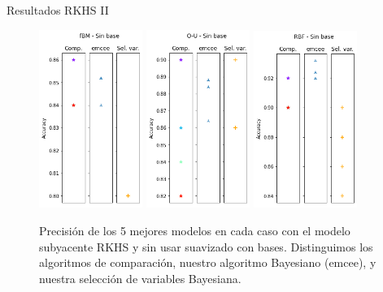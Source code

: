 \documentclass[10pt, spanish, professionalfonts]{beamer}
\begin{document}
\begin{frame}{Resultados RKHS II}
  \begin{figure}
    \includegraphics[width=0.3\textwidth]{img/results/log_rkhs_fbm_nobase}\hfill
    \includegraphics[width=0.3\textwidth]{img/results/log_rkhs_ou_nobase}\hfill
    \includegraphics[width=0.3\textwidth]{img/results/log_rkhs_rbf_nobase}
    \caption{Precisión de los 5 mejores modelos en cada caso con el modelo subyacente RKHS y sin usar suavizado con bases. Distinguimos los algoritmos de comparación, nuestro algoritmo Bayesiano (emcee), y nuestra selección de variables Bayesiana.}
  \end{figure}
\end{frame}
\end{document}

